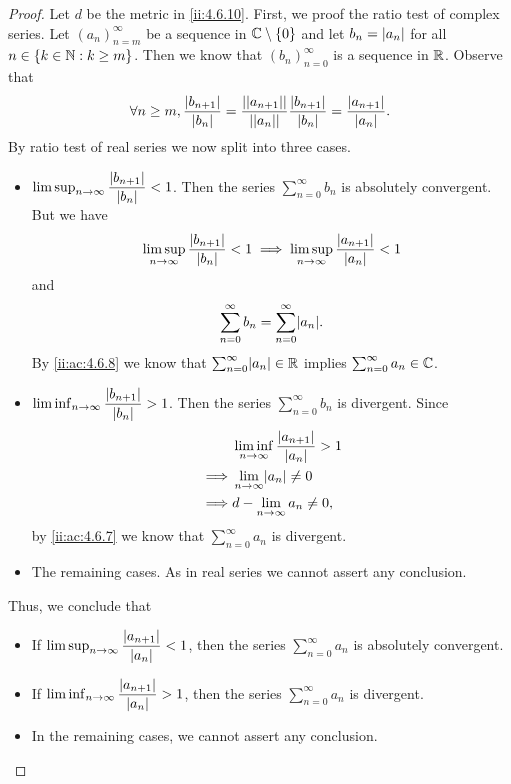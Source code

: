 \begin{proof}
  Let \(d\) be the metric in \cref{ii:4.6.10}.
  First, we proof the ratio test of complex series.
  Let \((a_n)_{n = m}^\infty\) be a sequence in \(\mathbb{C} \setminus \left\lbrace0\right\rbrace\) and let \(b_n = \left\lvert a_n\right\rvert\) for all \(n \in \left\lbrace k \in \mathbb{N} : k \geq m\right\rbrace\).
  Then we know that \((b_n)_{n = 0}^\infty\) is a sequence in \(\mathbb{R}\).
  Observe that
  \[
    \forall n \geq m, \dfrac{\left\lvert b_{n + 1}\right\rvert}{\left\lvert b_n\right\rvert} = \dfrac{\left\lvert\left\lvert a_{n + 1}\right\rvert\right\rvert}{\left\lvert\left\lvert a_n\right\rvert\right\rvert} \dfrac{\left\lvert b_{n + 1}\right\rvert}{\left\lvert b_n\right\rvert} = \dfrac{\left\lvert a_{n + 1}\right\rvert}{\left\lvert a_n\right\rvert}.
  \]
  By ratio test of real series we now split into three cases.
  \begin{itemize}
    \item \(\limsup_{n \to \infty} \dfrac{\left\lvert b_{n + 1}\right\rvert}{\left\lvert b_n\right\rvert} < 1\).
          Then the series \(\sum_{n = 0}^\infty b_n\) is absolutely convergent.
          But we have
          \[
            \limsup_{n \to \infty} \dfrac{\left\lvert b_{n + 1}\right\rvert}{\left\lvert b_n\right\rvert} < 1 \implies \limsup_{n \to \infty} \dfrac{\left\lvert a_{n + 1}\right\rvert}{\left\lvert a_n\right\rvert} < 1
          \]
          and
          \[
            \sum_{n = 0}^\infty b_n = \sum_{n = 0}^\infty \abs{a_n}.
          \]
          By \cref{ii:ac:4.6.8} we know that \(\sum_{n = 0}^\infty \abs{a_n} \in \R\) implies \(\sum_{n = 0}^\infty a_n \in \mathbb{C}\).
    \item \(\liminf_{n \to \infty} \dfrac{\left\lvert b_{n + 1}\right\rvert}{\left\lvert b_n\right\rvert} > 1\).
          Then the series \(\sum_{n = 0}^\infty b_n\) is divergent.
          Since
          \begin{align*}
                     & \liminf_{n \to \infty} \dfrac{\abs{a_{n + 1}}}{\abs{a_n}} > 1 \\
            \implies & \lim_{n \to \infty} \abs{a_n} \neq 0                          \\
            \implies & d - \lim_{n \to \infty} a_n \neq 0,
          \end{align*}
          by \cref{ii:ac:4.6.7} we know that \(\sum_{n = 0}^\infty a_n\) is divergent.
    \item The remaining cases.
          As in real series we cannot assert any conclusion.
  \end{itemize}
  Thus, we conclude that
  \begin{itemize}
    \item If \(\limsup_{n \to \infty} \dfrac{\left\lvert a_{n + 1}\right\rvert}{\left\lvert a_n\right\rvert} < 1\), then the series \(\sum_{n = 0}^\infty a_n\) is absolutely convergent.
    \item If \(\liminf_{n \to \infty} \dfrac{\left\lvert a_{n + 1}\right\rvert}{\left\lvert a_n\right\rvert} > 1\), then the series \(\sum_{n = 0}^\infty a_n\) is divergent.
    \item In the remaining cases, we cannot assert any conclusion.
  \end{itemize}


\end{proof}
